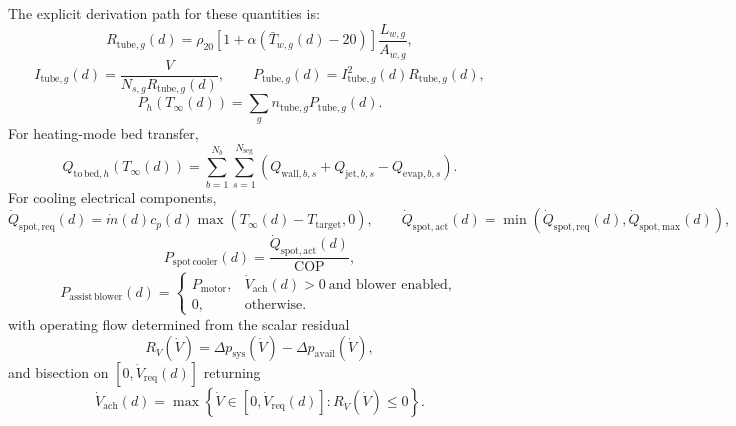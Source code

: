 \documentclass[11pt]{article}
\begin{document}
The explicit derivation path for these quantities is:
\begin{equation}
\label{eq:annual_heating_resistance}
R_{\mathrm{tube},g}(d)=\rho_{20}\!\left[1+\alpha\!\left(\bar T_{w,g}(d)-20\right)\right]\frac{L_{w,g}}{A_{w,g}},
\end{equation}
\begin{equation}
\label{eq:annual_heating_current_power}
I_{\mathrm{tube},g}(d)=\frac{V}{N_{s,g}R_{\mathrm{tube},g}(d)},
\qquad
P_{\mathrm{tube},g}(d)=I_{\mathrm{tube},g}^2(d)R_{\mathrm{tube},g}(d),
\end{equation}
\begin{equation}
\label{eq:annual_heating_total_power}
P_h(T_\infty(d))=\sum_g n_{\mathrm{tube},g}P_{\mathrm{tube},g}(d).
\end{equation}
For heating-mode bed transfer,
\begin{equation}
\label{eq:annual_heating_q_to_bed}
Q_{\mathrm{to\,bed},h}(T_\infty(d))=
\sum_{b=1}^{N_b}\sum_{s=1}^{N_{\mathrm{seg}}}
\left(Q_{\mathrm{wall},b,s}+Q_{\mathrm{jet},b,s}-Q_{\mathrm{evap},b,s}\right).
\end{equation}
For cooling electrical components,
\begin{equation}
\label{eq:annual_cooling_spot_req_act}
\dot Q_{\mathrm{spot,req}}(d)=\dot m(d)c_p(d)\max\!\left(T_\infty(d)-T_{\mathrm{target}},0\right),
\qquad
\dot Q_{\mathrm{spot,act}}(d)=\min\!\left(\dot Q_{\mathrm{spot,req}}(d),\dot Q_{\mathrm{spot,max}}(d)\right),
\end{equation}
\begin{equation}
\label{eq:annual_cooling_spot_power}
P_{\mathrm{spot\,cooler}}(d)=\frac{\dot Q_{\mathrm{spot,act}}(d)}{\mathrm{COP}},
\end{equation}
\begin{equation}
\label{eq:annual_cooling_blower_power}
P_{\mathrm{assist\,blower}}(d)=
\begin{cases}
P_{\mathrm{motor}}, & \dot V_{\mathrm{ach}}(d)>0\ \text{and blower enabled},\\
0, & \text{otherwise}.
\end{cases}
\end{equation}
with operating flow determined from the scalar residual
\begin{equation}
\label{eq:annual_cooling_flow_residual}
R_{\dot V}(\dot V)=\Delta p_{\mathrm{sys}}(\dot V)-\Delta p_{\mathrm{avail}}(\dot V),
\end{equation}
and bisection on \([0,\dot V_{\mathrm{req}}(d)]\) returning
\begin{equation}
\label{eq:annual_cooling_flow_achieved}
\dot V_{\mathrm{ach}}(d)=\max\!\left\{\dot V\in[0,\dot V_{\mathrm{req}}(d)] : R_{\dot V}(\dot V)\le 0\right\}.
\end{equation}
\end{document}
